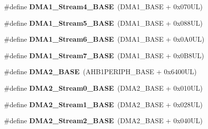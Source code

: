 \begin{DoxyCompactItemize}
\item 
\mbox{\label{group___peripheral__memory__map_ga757a3c0d866c0fe68c6176156065a26b}} 
\#define {\bfseries D\+M\+A1\+\_\+\+Stream4\+\_\+\+B\+A\+SE}~(D\+M\+A1\+\_\+\+B\+A\+SE + 0x070\+U\+L)
\item 
\mbox{\label{group___peripheral__memory__map_ga0ded7bed8969fe2e2d616e7f90eb7654}} 
\#define {\bfseries D\+M\+A1\+\_\+\+Stream5\+\_\+\+B\+A\+SE}~(D\+M\+A1\+\_\+\+B\+A\+SE + 0x088\+U\+L)
\item 
\mbox{\label{group___peripheral__memory__map_ga58998ddc40adb6361704d6c9dad08125}} 
\#define {\bfseries D\+M\+A1\+\_\+\+Stream6\+\_\+\+B\+A\+SE}~(D\+M\+A1\+\_\+\+B\+A\+SE + 0x0\+A0\+U\+L)
\item 
\mbox{\label{group___peripheral__memory__map_ga82186dd6d3f60995d428b34c041919d7}} 
\#define {\bfseries D\+M\+A1\+\_\+\+Stream7\+\_\+\+B\+A\+SE}~(D\+M\+A1\+\_\+\+B\+A\+SE + 0x0\+B8\+U\+L)
\item 
\mbox{\label{group___peripheral__memory__map_gab72a9ae145053ee13d1d491fb5c1df64}} 
\#define {\bfseries D\+M\+A2\+\_\+\+B\+A\+SE}~(A\+H\+B1\+P\+E\+R\+I\+P\+H\+\_\+\+B\+A\+SE + 0x6400\+U\+L)
\item 
\mbox{\label{group___peripheral__memory__map_gac4c67b24726ba6b94d03adb351bcec4d}} 
\#define {\bfseries D\+M\+A2\+\_\+\+Stream0\+\_\+\+B\+A\+SE}~(D\+M\+A2\+\_\+\+B\+A\+SE + 0x010\+U\+L)
\item 
\mbox{\label{group___peripheral__memory__map_ga35512bdc3f5e9df4557c2fbe7935d0b1}} 
\#define {\bfseries D\+M\+A2\+\_\+\+Stream1\+\_\+\+B\+A\+SE}~(D\+M\+A2\+\_\+\+B\+A\+SE + 0x028\+U\+L)
\item 
\mbox{\label{group___peripheral__memory__map_gaed33a06f08188466f2ede06160984e9a}} 
\#define {\bfseries D\+M\+A2\+\_\+\+Stream2\+\_\+\+B\+A\+SE}~(D\+M\+A2\+\_\+\+B\+A\+SE + 0x040\+U\+L)
\item 
\mbox{\label{group___peripheral__memory__map_gaf3a9480e08c6ae94f4482e0cdaebdd17}} 

\end{DoxyCompactItemize}
